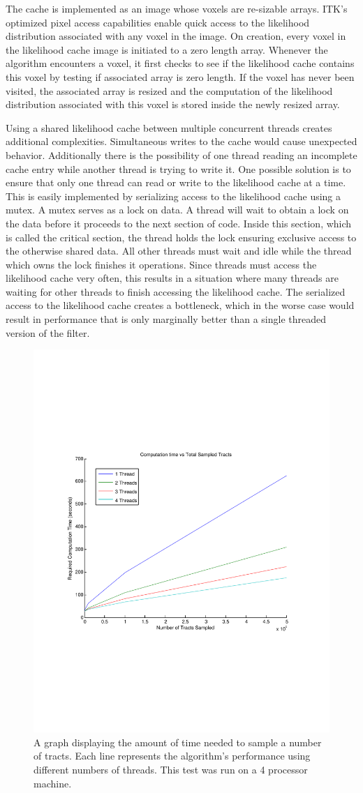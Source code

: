 The cache is implemented as an image whose voxels are re-sizable arrays.  ITK's optimized pixel access capabilities enable quick access to the likelihood distribution associated with any voxel in the image.  On creation, every voxel in the likelihood cache image is initiated to a zero length array.  Whenever the algorithm encounters a voxel, it first checks to see if the likelihood cache contains this voxel by testing if associated array is zero length.  If the voxel has never been visited, the associated array is resized and the computation of the likelihood distribution associated with this voxel is stored inside the newly resized array.

Using a shared likelihood cache between multiple concurrent threads creates additional complexities.  Simultaneous writes to the cache would cause unexpected behavior.  Additionally there is the possibility of one thread reading an incomplete cache entry while another thread is trying to write it.  One possible solution is to ensure that only one thread can read or write to the likelihood cache at a time.  This is easily implemented by serializing access to the likelihood cache using a mutex.  A mutex serves as a lock on data.  A thread will wait to obtain a lock on the data before it proceeds to the next section of code.  Inside this section, which is called the critical section, the thread holds the lock ensuring exclusive access to the otherwise shared data.  All other threads must wait and idle while the thread which owns the lock finishes it operations.  Since threads must access the likelihood cache very often, this results in a situation where many threads are waiting for other threads to finish accessing the likelihood cache.  The serialized access to the likelihood cache creates a bottleneck, which in the worse case would result in performance that is only marginally better than a single threaded version of the filter.
\begin{figure}
  \center
  \includegraphics[trim = 20mm 70mm 20mm 70mm, clip, width=0.5\linewidth]
	  {timepertracts}
	\caption{A graph displaying the amount of time needed to sample a number of tracts.  Each line represents the algorithm's performance using different numbers of threads.  This test was run on a 4 processor machine.}
	\label{fig:performance}
\end{figure}

